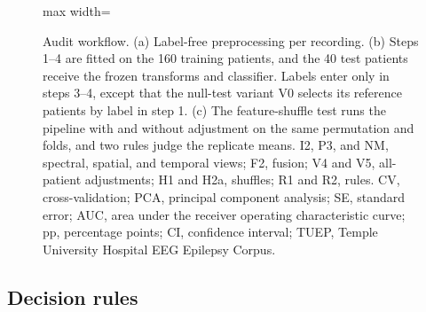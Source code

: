 \documentclass[final,1p,times]{elsarticle}
\begin{document}
\begin{figure}[t]
\begin{adjustbox}{max width=\textwidth}
\end{adjustbox}
\caption{Audit workflow. (a) Label-free preprocessing per recording. (b) Steps 1--4 are fitted on the 160 training patients, and the 40 test patients receive the frozen transforms and classifier. Labels enter only in steps 3--4, except that the null-test variant V0 selects its reference patients by label in step 1. (c) The feature-shuffle test runs the pipeline with and without adjustment on the same permutation and folds, and two rules judge the replicate means. I2, P3, and NM, spectral, spatial, and temporal views; F2, fusion; V4 and V5, all-patient adjustments; H1 and H2a, shuffles; R1 and R2, rules. CV, cross-validation; PCA, principal component analysis; SE, standard error; AUC, area under the receiver operating characteristic curve; pp, percentage points; CI, confidence interval; TUEP, Temple University Hospital EEG Epilepsy Corpus.}\label{fig:alur}
\end{figure}%

\subsection{Decision rules}\label{sec:sensitivitas}
\end{document}
